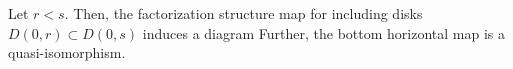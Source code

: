 \documentclass[10pt]{amsart}
\begin{document}



\begin{lem}
Let $r < s$.
Then, the factorization structure map for including disks $D(0,r) \subset D(0,s)$ induces a diagram
\ben
{}
\een
Further, the bottom horizontal map is a quasi-isomorphism.
\end{lem}
\end{document}
